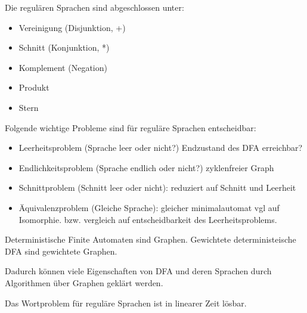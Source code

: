 \documentclass{scrartcl}
\begin{document}
\begin{theorem}
Die regulären Sprachen sind abgeschlossen unter:
\begin{itemize}
    \item Vereinigung (Disjunktion, +)
	\item Schnitt (Konjunktion, *)
	\item Komplement (Negation)
	\item Produkt 
	\item Stern
\end{itemize}
\end{theorem}
\begin{theorem}

\begin{theorem}
Folgende wichtige Probleme sind für reguläre Sprachen entscheidbar:\autocite[42]{TKIG:2003}
\begin{itemize}
	\item Leerheitsproblem (Sprache leer oder nicht?)
		Endzustand des DFA erreichbar?
	\item Endlichkeitsproblem (Sprache endlich oder nicht?)
		zyklenfreier Graph
	\item Schnittproblem (Schnitt leer oder nicht): 
			reduziert auf Schnitt und Leerheit
	\item Äquivalenzproblem (Gleiche Sprache):
			gleicher minimalautomat vgl auf Isomorphie.
			bzw. vergleich auf entscheidbarkeit des Leerheitsproblems.
\end{itemize}

\begin{remark}
Deterministische Finite Automaten sind Graphen.
Gewichtete deterministeische DFA sind gewichtete Graphen.

Dadurch können viele Eigenschaften von DFA und deren Sprachen durch 
Algorithmen über Graphen geklärt werden.
\end{remark}

\begin{theorem}
Das Wortproblem für reguläre Sprachen ist in linearer Zeit lösbar.
\end{theorem}

\end{theorem}
\end{theorem}
\end{document}
